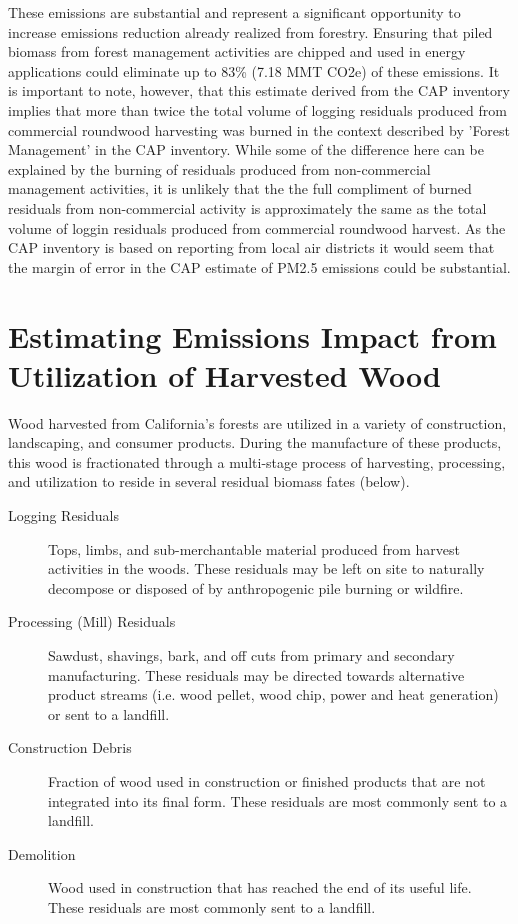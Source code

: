 \documentclass[a4paper,titlepage]{article}
\begin{document}
These emissions are substantial and represent a significant opportunity to increase emissions reduction already realized from forestry. Ensuring that piled biomass from forest management activities are chipped and used in energy applications could eliminate up to 83\% (7.18 MMT \ac{CO2e}) of these emissions. It is important to note, however, that this estimate derived from the \ac{CAP} inventory implies that more than twice the total volume of logging residuals produced from commercial roundwood harvesting was burned in the context described by 'Forest Management' in the \ac{CAP} inventory. While some of the difference here can be explained by the burning of residuals produced from non-commercial management activities, it is unlikely that the the full compliment of burned residuals from non-commercial activity is approximately the same as the total volume of loggin residuals produced from commercial roundwood harvest. As the \ac{CAP} inventory is based on reporting from local air districts it would seem that the margin of error in the \ac{CAP} estimate of \ac{PM2.5} emissions could be substantial.

\section{Estimating Emissions Impact from Utilization of Harvested Wood}
\label{sec:orgheadline22}
Wood harvested from California's forests are utilized in a variety of construction,
landscaping, and consumer products. During the manufacture of these products, this wood is fractionated 
through a multi-stage process of harvesting, processing, and utilization to reside in several residual biomass fates (below). 

\begin{description}
\item[{Logging Residuals}] Tops, limbs, and sub-merchantable material produced from harvest activities in the woods. These residuals may be left on site to naturally decompose or disposed of by anthropogenic pile burning or wildfire.
\item[{Processing (Mill) Residuals}] Sawdust, shavings, bark, and off cuts from primary and secondary manufacturing. These residuals may be directed towards alternative product streams (i.e. wood pellet, wood chip, power and heat generation) or sent to a landfill.
\item[{Construction Debris}] Fraction of wood used in construction or finished products that are not integrated into its final form. These residuals are most commonly sent to a landfill.
\item[{Demolition}] Wood used in construction that has reached the end of its useful life. These residuals are most commonly sent to a landfill.
\end{description}
\end{document}

